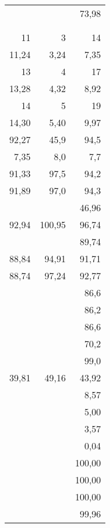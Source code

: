 \begin{tabular}{|r|r|r|}
	               &        &        73,98 \\
	               &        &              \\
	               &        &              \\
	            11 &      3 &           14 \\
	         11,24 &   3,24 &         7,35 \\
	            13 &      4 &           17 \\
	         13,28 &   4,32 &         8,92 \\
	            14 &      5 &           19 \\
	         14,30 &   5,40 &         9,97 \\
	         92,27 &   45,9 &         94,5 \\
	          7,35 &    8,0 &          7,7 \\
	         91,33 &   97,5 &         94,2 \\
	         91,89 &   97,0 &         94,3 \\
	               &        &        46,96 \\
	         92,94 & 100,95 &        96,74 \\
	               &        &        89,74 \\
	         88,84 &  94,91 &        91,71 \\
	         88,74 &  97,24 &        92,77 \\
	               &        &         86,6 \\
	\cmidrule{3-3} &        &         86,2 \\
	               &        &         86,6 \\
	               &        &         70,2 \\
	               &        &         99,0 \\
	         39,81 &  49,16 &        43,92 \\
	               &        &         8,57 \\
	               &        &         5,00 \\
	               &        &         3,57 \\
	               &        &         0,04 \\
	               &        &       100,00 \\
	               &        &       100,00 \\
	               &        &       100,00 \\
	               &        &        99,96 \\

\end{tabular}
